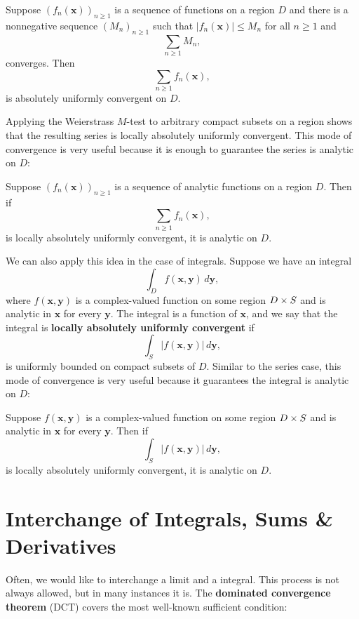     \begin{theorem}
      Suppose $(f_{n}(\mathbf{x}))_{n \ge 1}$ is a sequence of functions on a region $D$ and there is a nonnegative sequence $(M_{n})_{n \ge 1}$ such that $|f_{n}(\mathbf{x})| \le M_{n}$ for all $n \ge 1$ and
      \[
        \sum_{n \ge 1}M_{n},
      \]
      converges. Then
      \[
        \sum_{n \ge 1}f_{n}(\mathbf{x}),
      \]
      is absolutely uniformly convergent on $D$.
    \end{theorem}

    Applying the Weierstrass $M$-test to arbitrary compact subsets on a region shows that the resulting series is locally absolutely uniformly convergent. This mode of convergence is very useful because it is enough to guarantee the series is analytic on $D$:

    \begin{theorem}
      Suppose $(f_{n}(\mathbf{x}))_{n \ge 1}$ is a sequence of analytic functions on a region $D$. Then if
      \[
        \sum_{n \ge 1}f_{n}(\mathbf{x}),
      \]
      is locally absolutely uniformly convergent, it is analytic on $D$.
    \end{theorem}

    We can also apply this idea in the case of integrals. Suppose we have an integral
    \[
      \int_{D}f(\mathbf{x},\mathbf{y})\,d\mathbf{y},
    \]
    where $f(\mathbf{x},\mathbf{y})$ is a complex-valued function on some region $D \times S$ and is analytic in $\mathbf{x}$ for every $\mathbf{y}$. The integral is a function of $\mathbf{x}$, and we say that the integral is \textbf{locally absolutely uniformly convergent} if
    \[
      \int_{S}|f(\mathbf{x},\mathbf{y})|\,d\mathbf{y},
    \]
    is uniformly bounded on compact subsets of $D$. Similar to the series case, this mode of convergence is very useful because it guarantees the integral is analytic on $D$:

    \begin{theorem}\label{thm:analytic_integral}
      Suppose $f(\mathbf{x},\mathbf{y})$ is a complex-valued function on some region $D \times S$ and is analytic in $\mathbf{x}$ for every $\mathbf{y}$. Then if
      \[
        \int_{S}|f(\mathbf{x},\mathbf{y})|\,d\mathbf{y},
      \]
      is locally absolutely uniformly convergent, it is analytic on $D$.
    \end{theorem}
  \section{Interchange of Integrals, Sums \& Derivatives}
    Often, we would like to interchange a limit and a integral. This process is not always allowed, but in many instances it is. The \textbf{dominated convergence theorem} (DCT) covers the most well-known sufficient condition:

